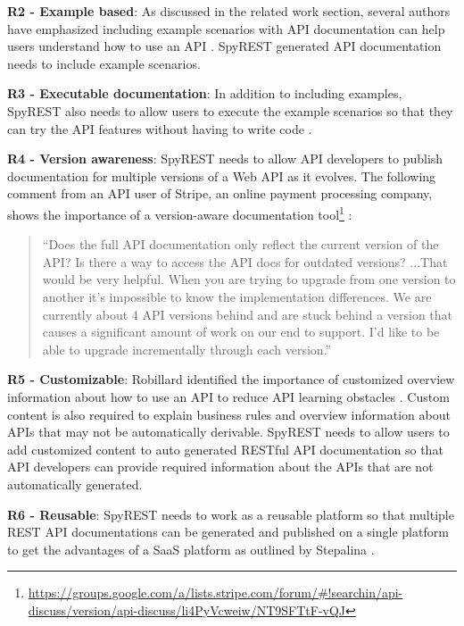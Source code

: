 \documentclass[conference]{IEEEtran}
\begin{document}
  \textbf{R2 - Example based}: As discussed in the related work section, several authors have emphasized including example scenarios with API documentation can help users understand how to use an API \cite{Robillard_what_makes} \cite{Kuhn_on_designing} \cite{Hoffman_api_documentation} \cite{Nasehi_what_makes}. SpyREST generated API documentation needs to include example scenarios.

  \textbf{R3 - Executable documentation}: In addition to including examples, SpyREST also needs to allow users to execute the example scenarios so that they can try the API features without having to write code \cite{Hoffman_api_documentation} \cite{Myers_study}.

  \textbf{R4 - Version awareness}: SpyREST needs to allow API developers to publish documentation for multiple versions of a Web API as it evolves. The following comment from an API user of Stripe, an online payment processing company, shows the importance of a version-aware documentation tool\footnote{\url{https://groups.google.com/a/lists.stripe.com/forum/#!searchin/api-discuss/version/api-discuss/li4PyVcweiw/NT9SFTtF-vQJ}}
:
  \small
  \begin{quotation}
   ``Does the full API documentation only reflect the current version of the
    API?  Is there a way to access the API docs for outdated versions? ...That would be very helpful. When you are trying to upgrade from one version to another it's impossible to know the implementation differences. We are currently about 4 API versions behind and are stuck behind a version that causes a significant amount of work on our end to support. I'd like to be able to upgrade incrementally through each version.''
  \end{quotation}
  \normalsize

  \textbf{R5 - Customizable}: Robillard identified the importance of customized overview information about how to use an API to reduce API learning obstacles \cite{Robillard_what_makes}. Custom content is also required to explain business rules and overview information about APIs that may not be automatically derivable. SpyREST needs to allow users to add customized content to auto generated RESTful API documentation so that API developers can provide required information about the APIs that are not automatically generated.

  \textbf{R6 - Reusable}: SpyREST needs to work as a reusable platform so that multiple REST API documentations can be generated and published on a single platform to get the advantages of a SaaS platform as outlined by Stepalina \cite{Stepalina_saas}.
\end{document}
